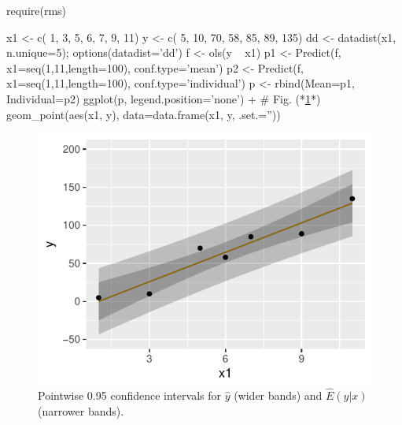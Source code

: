 \begin{Schunk}
\begin{Sinput}
require(rms)
\end{Sinput}
\begin{Sinput}
x1 <- c( 1,  3,  5,  6,  7,  9,  11)
y  <- c( 5, 10, 70, 58, 85, 89, 135)
dd <- datadist(x1, n.unique=5); options(datadist='dd')
f <- ols(y ~ x1)
p1 <- Predict(f, x1=seq(1,11,length=100), conf.type='mean')
p2 <- Predict(f, x1=seq(1,11,length=100), conf.type='individual')
p <- rbind(Mean=p1, Individual=p2)
ggplot(p, legend.position='none') +    # Fig. (*\ref{fig:reg-both-type-cls}*)
     geom_point(aes(x1, y), data=data.frame(x1, y, .set.=''))
\end{Sinput}
\begin{figure}[htbp]

\centerline{\includegraphics{reg-both-type-cls-1} }

\caption[Two types of confidence bands]{Pointwise 0.95 confidence intervals for $\hat{y}$ (wider bands) and $\hat{E}(y|x)$ (narrower bands).}\label{fig:reg-both-type-cls}
\end{figure}
\end{Schunk}
\ei
\clearpage


